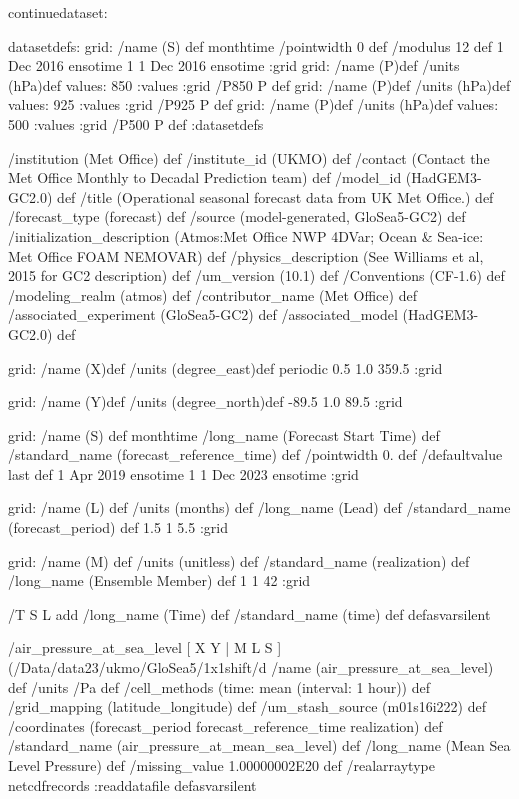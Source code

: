 \begin{ingrid}
continuedataset:

datasetdefs:
grid:
/name (S) def
monthtime
/pointwidth 0 def
/modulus 12 def
1 Dec 2016 ensotime
1
1 Dec 2016 ensotime
:grid
grid:
/name (P)def
/units (hPa)def
values: 850 :values
:grid
/P850 P def
grid:
/name (P)def
/units (hPa)def
values: 925 :values
:grid
/P925 P def
grid:
/name (P)def
/units (hPa)def
values: 500 :values
:grid
/P500 P def
:datasetdefs

 /institution (Met Office) def
 /institute_id (UKMO) def
 /contact (Contact the Met Office Monthly to Decadal Prediction team) def
 /model_id (HadGEM3-GC2.0) def
 /title (Operational seasonal forecast data from UK Met Office.) def
 /forecast_type (forecast) def
 /source (model-generated, GloSea5-GC2) def
 /initialization_description (Atmos:Met Office NWP 4DVar; Ocean & Sea-ice: Met Office FOAM NEMOVAR) def
 /physics_description (See Williams et al, 2015 for GC2 description) def 
 /um_version (10.1) def
 /Conventions (CF-1.6) def
 /modeling_realm (atmos) def
 /contributor_name (Met Office) def
 /associated_experiment (GloSea5-GC2) def
 /associated_model (HadGEM3-GC2.0) def

grid:
/name (X)def
/units (degree_east)def
periodic
 0.5 1.0 359.5
:grid

grid:
/name (Y)def
/units (degree_north)def
 -89.5 1.0 89.5
:grid

grid:
/name (S) def
monthtime
/long_name (Forecast Start Time) def
/standard_name (forecast_reference_time) def
/pointwidth 0. def
/defaultvalue {last} def
1 Apr 2019 ensotime
1
1 Dec 2023 ensotime
:grid

grid:
/name (L) def
/units (months) def
/long_name (Lead) def
/standard_name (forecast_period) def
1.5 1 5.5
:grid

grid:
/name (M) def
/units (unitless) def
/standard_name (realization) def
/long_name (Ensemble Member) def
1 1 42
:grid

/T { S L add
/long_name (Time) def
/standard_name (time) def
 } defasvarsilent

 /air_pressure_at_sea_level{
[ X Y | M L S ] (/Data/data23/ukmo/GloSea5/1x1shift/d%
/name (air_pressure_at_sea_level) def
 /units /Pa def
 /cell_methods (time: mean (interval: 1 hour)) def
 /grid_mapping (latitude_longitude) def
 /um_stash_source (m01s16i222) def
 /coordinates (forecast_period forecast_reference_time realization) def
 /standard_name (air_pressure_at_mean_sea_level) def
 /long_name (Mean Sea Level Pressure) def
 /missing_value 1.00000002E20 def
 /realarraytype netcdfrecords :readdatafile
}defasvarsilent



\end{ingrid}
